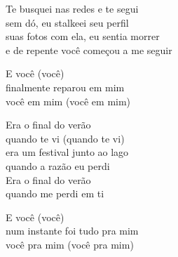 \begin{lyrics}
Te busquei nas redes e te segui\\
sem dó, eu stalkeei seu perfil\\
suas fotos com ela, eu sentia morrer\\
e de repente você começou a me seguir

E você (você)\\
finalmente reparou em mim\\
você em mim (você em mim)

Era o final do verão\\
quando te vi (quando te vi)\\
era um festival junto ao lago\\
quando a razão eu perdi\\
Era o final do verão\\
quando me perdi em ti

E você (você)\\
num instante foi tudo pra mim\\
você pra mim (você pra mim)
\end{lyrics}

